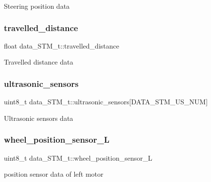 Steering position data \hypertarget{structdata___s_t_m__t_ae80e8b57c0137231caeb56a150d46aa4}{}\label{structdata___s_t_m__t_ae80e8b57c0137231caeb56a150d46aa4} 
\subsubsection{\texorpdfstring{travelled\+\_\+distance}{travelled\_distance}}
{\footnotesize\ttfamily float data\+\_\+\+S\+T\+M\+\_\+t\+::travelled\+\_\+distance}

Travelled distance data \hypertarget{structdata___s_t_m__t_a2b584d14638921f686e91193ab59937c}{}\label{structdata___s_t_m__t_a2b584d14638921f686e91193ab59937c} 
\subsubsection{\texorpdfstring{ultrasonic\+\_\+sensors}{ultrasonic\_sensors}}
{\footnotesize\ttfamily uint8\+\_\+t data\+\_\+\+S\+T\+M\+\_\+t\+::ultrasonic\+\_\+sensors\mbox{[}D\+A\+T\+A\+\_\+\+S\+T\+M\+\_\+\+U\+S\+\_\+\+N\+UM\mbox{]}}

Ultrasonic sensors data \hypertarget{structdata___s_t_m__t_a179ffd7182c86ef85d3a5bbd1acf3290}{}\label{structdata___s_t_m__t_a179ffd7182c86ef85d3a5bbd1acf3290} 
\subsubsection{\texorpdfstring{wheel\+\_\+position\+\_\+sensor\+\_\+L}{wheel\_position\_sensor\_L}}
{\footnotesize\ttfamily uint8\+\_\+t data\+\_\+\+S\+T\+M\+\_\+t\+::wheel\+\_\+position\+\_\+sensor\+\_\+L}

position sensor data of left motor \hypertarget{structdata___s_t_m__t_a86c2662ee8ae8cef331de1a36285e9ee}{}\label{structdata___s_t_m__t_a86c2662ee8ae8cef331de1a36285e9ee} 
